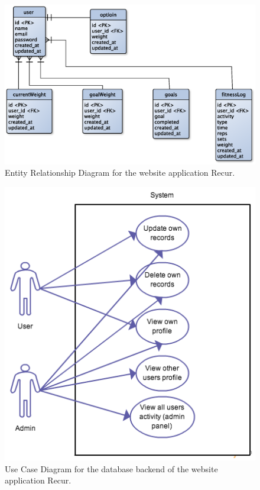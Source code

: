 \begin{figure}[!ht]
\centering
\includegraphics[scale=0.5]{chapters/figs/erd}
\caption{Entity Relationship Diagram for the website application Recur.}
\label{fig:erd}
\end{figure}

\begin{figure}[!ht]
\centering
\includegraphics[scale=0.5]{chapters/figs/ucd}
\caption{Use Case Diagram for the database backend of the website application Recur.}
\label{fig:ucd}
\end{figure}


